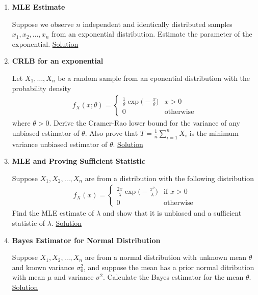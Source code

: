 \documentclass[../probability-notes.tex]{subfiles}
\begin{document}
\begin{enumerate}
    \item \hypertarget{q_mleestimate}{\textbf{MLE Estimate}}\newline
    Suppose we observe $n$ independent and identically distributed samples $x_{1}, x_{2}, \ldots, x_{n}$ from an exponential distribution. Estimate the parameter of the exponential. \hyperlink{a_mleestimate}{Solution}

    \item \hypertarget{q_crlb_exp}{\textbf{CRLB for an exponential}}\newline
    Let $X_{1}, \ldots, X_{n}$ be a random sample from an eponential distribution with the probability density
    \begin{align*}
        f_{X}(x;\theta) = \begin{cases} \frac{1}{\theta} \exp \big(-\frac{x}{\theta} \big) &\mbox{$x > 0$}\\ 0 &\mbox{otherwise} \end{cases}
    \end{align*}
    where $\theta > 0$. Derive the Cramer-Rao lower bound for the variance of any unbiased estimator of $\theta$. Also prove that $T = \frac{1}{n} \sum_{i=1}^{n} X_{i}$ is the minimum variance unbiased estimator of $\theta$. \hyperlink{a_crlb_exp}{Solution}

    \item \hypertarget{q_mle_sufficient_statistic}{\textbf{MLE and Proving Sufficient Statistic}}\newline
    Suppose $X_{1}, X_{2}, \ldots, X_{n}$ are from a distribution with the following distribution
    \begin{align*}
        f_{X}(x) = \begin{cases} \frac{2x}{\lambda} \exp \big(-\frac{x^{2}}{\lambda} \big) &\mbox{if $x > 0$}\\ 0 &\mbox{otherwise} \end{cases}
    \end{align*}
    Find the MLE estimate of $\lambda$ and show that it is unbiased and a sufficient statistic of $\lambda$.
    \hyperlink{a_mle_sufficient_statistic}{Solution}

    \item \hypertarget{q_bayesnormal}{\textbf{Bayes Estimator for Normal Distribution}}\newline
    Suppose $X_{1}, X_{2}, \ldots, X_{n}$ are from a normal distribution with unknown mean $\theta$ and known variance $\sigma_{0}^{2}$, and suppose the mean has a prior normal ditribution with mean $\mu$ and variance $\sigma^{2}$. Calculate the Bayes estimator for the mean $\theta$.
    \hyperlink{a_bayesnormal}{Solution}


\end{enumerate}
\end{document}
